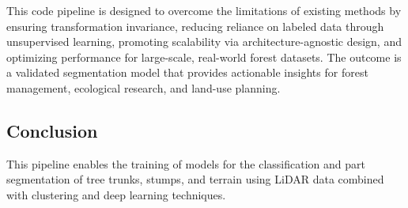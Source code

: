 \documentclass[../report.tex]{subfiles}
\begin{document}
This code pipeline is designed to overcome the limitations of existing methods by ensuring transformation invariance, reducing reliance on labeled data through unsupervised learning, promoting scalability via architecture-agnostic design, and optimizing performance for large-scale, real-world forest datasets. The outcome is a validated segmentation model that provides actionable insights for forest management, ecological research, and land-use planning.

\subsection{Conclusion}
This pipeline enables the training of models for the classification and part segmentation of tree trunks, stumps, and terrain using LiDAR data combined with clustering and deep learning techniques.
\end{document}
